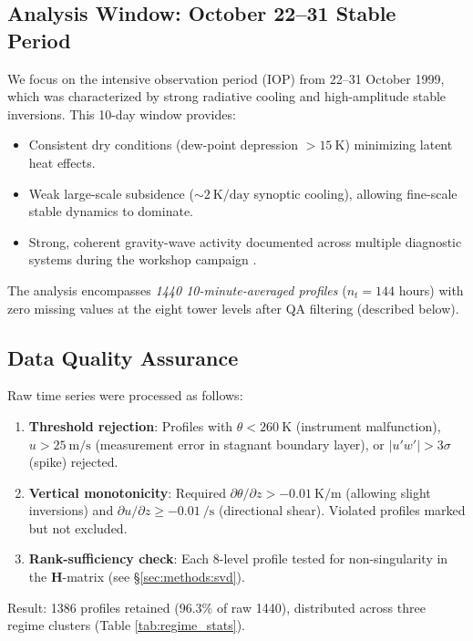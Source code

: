 \documentclass[11pt,a4paper]{article}
\begin{document}
\subsection{Analysis Window: October 22--31 Stable Period}

We focus on the intensive observation period (IOP) from 22--31 October 1999, which was characterized by strong radiative cooling and high-amplitude stable inversions. This 10-day window provides:
\begin{itemize}
  \item Consistent dry conditions (dew-point depression $> \SI{15}{\kelvin}$) minimizing latent heat effects.
  \item Weak large-scale subsidence ($\sim \SI{2}{\kelvin\per\text{day}}$ synoptic cooling), allowing fine-scale stable dynamics to dominate.
  \item Strong, coherent gravity-wave activity documented across multiple diagnostic systems during the workshop campaign \citep{Poulos2002}.
\end{itemize}

The analysis encompasses \emph{1440 10-minute-averaged profiles} ($n_t = 144$ hours) with zero missing values at the eight tower levels after QA filtering (described below).

\subsection{Data Quality Assurance}

Raw time series were processed as follows:
\begin{enumerate}
  \item \textbf{Threshold rejection}: Profiles with $\theta < \SI{260}{\kelvin}$ (instrument malfunction), $u > \SI{25}{\meter\per\second}$ (measurement error in stagnant boundary layer), or $|u'w'| > 3\sigma$ (spike) rejected.
  \item \textbf{Vertical monotonicity}: Required $\partial \theta / \partial z > -\SI{0.01}{\kelvin\per\meter}$ (allowing slight inversions) and $\partial u / \partial z \geq -\SI{0.01}{\per\second}$ (directional shear). Violated profiles marked but not excluded.
  \item \textbf{Rank-sufficiency check}: Each 8-level profile tested for non-singularity in the $\mathbf{H}$-matrix (see \S\ref{sec:methods:svd}).
\end{enumerate}

Result: 1386 profiles retained ($96.3\%$ of raw 1440), distributed across three regime clusters (Table \ref{tab:regime_stats}).
\end{document}
